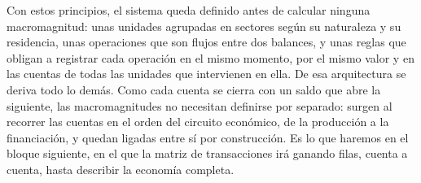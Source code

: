 \documentclass[10pt,a4paper]{article}
\begin{document}
Con estos principios, el sistema queda definido antes de calcular ninguna macromagnitud: unas unidades agrupadas en sectores según su naturaleza y su residencia, unas operaciones que son flujos entre dos balances, y unas reglas que obligan a registrar cada operación en el mismo momento, por el mismo valor y en las cuentas de todas las unidades que intervienen en ella. De esa arquitectura se deriva todo lo demás. Como cada cuenta se cierra con un saldo que abre la siguiente, las macromagnitudes no necesitan definirse por separado: surgen al recorrer las cuentas en el orden del circuito económico, de la producción a la financiación, y quedan ligadas entre sí por construcción. Es lo que haremos en el bloque siguiente, en el que la matriz de transacciones irá ganando filas, cuenta a cuenta, hasta describir la economía completa.











\clearpage
\end{document}
